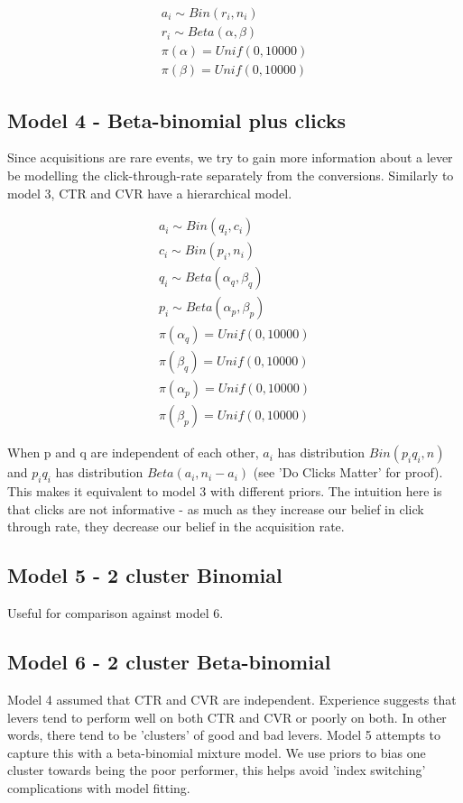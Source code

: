 \documentclass[12pt]{article}
\begin{document}
  \begin{align}
	a_i \sim Bin(r_i,n_i) \\
	r_i \sim Beta(\alpha,\beta) \\
	\pi(\alpha) = Unif(0,10000) \\
	\pi(\beta) = Unif(0,10000)
  \end{align}

\subsection{Model 4 - Beta-binomial plus clicks} 
Since acquisitions are rare events, we try to gain more information about a lever be modelling the click-through-rate separately from the conversions. Similarly to model 3, CTR and CVR have a hierarchical model.

  \begin{align}
	a_i \sim Bin(q_i,c_i) \\
	c_i \sim Bin(p_i,n_i) \\
	q_i \sim Beta(\alpha_q,\beta_q) \\
	p_i \sim Beta(\alpha_p,\beta_p) \\
	\pi(\alpha_q) = Unif(0,10000) \\
	\pi(\beta_q) = Unif(0,10000) \\
	\pi(\alpha_p) = Unif(0,10000) \\
	\pi(\beta_p) = Unif(0,10000) 
  \end{align}

When p and q are independent of each other, $a_i$ has distribution $Bin(p_iq_i,n)$ and $p_iq_i$ has distribution $Beta(a_i,n_i - a_i)$ (see 'Do Clicks Matter' for proof). This makes it equivalent to model 3 with different priors. The intuition here is that clicks are not informative - as much as they increase our belief in click through rate, they decrease our belief in the acquisition rate.

\subsection{Model 5 - 2 cluster Binomial} 

Useful for comparison against model 6.

\subsection{Model 6 - 2 cluster Beta-binomial }

Model 4 assumed that CTR and CVR are independent. Experience suggests that levers tend to perform well on both CTR and CVR or poorly on both. In other words, there tend to be 'clusters' of good and bad levers. Model 5 attempts to capture this with a beta-binomial mixture model. We use priors to bias one cluster towards being the poor performer, this helps avoid 'index switching' complications with model fitting. 
 
\end{document}
